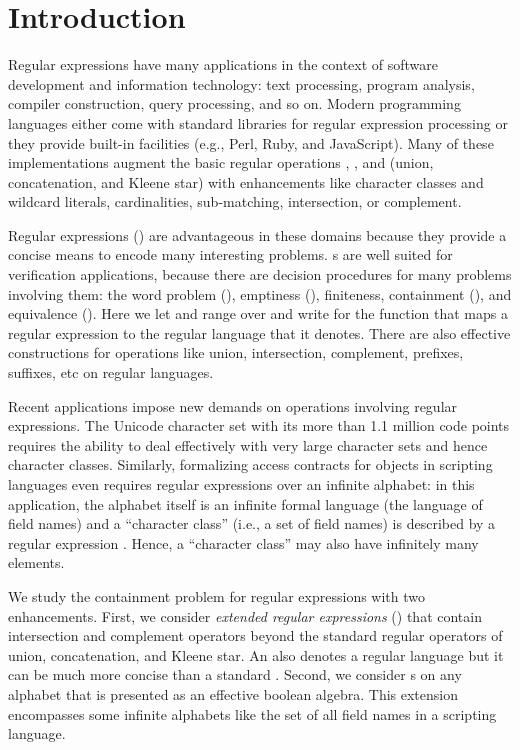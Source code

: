 \section{Introduction}
\label{sec:Introduction}

Regular expressions have many applications in the context of software
development and information technology: text processing, program analysis, compiler
construction, query processing, and so on. Modern programming languages
either come with standard libraries for regular expression processing or they
provide built-in facilities (e.g., Perl, Ruby, and JavaScript). Many
of these implementations augment the basic regular operations ,
, and  (union, concatenation, and
Kleene star) with enhancements like character classes and wildcard
literals, cardinalities, sub-matching, intersection, or
complement.

Regular expressions (\RE) are advantageous in these domains because they provide a concise means to
encode many interesting problems. \RE{}s are well suited for verification applications, because
there are decision procedures for many problems involving them: the word problem
(), emptiness (), finiteness, containment
(), and equivalence (). Here
we let  and  range over \RE{} and write  for the function that maps
a regular expression to the regular language that it denotes. There are also effective constructions
for operations like union, intersection, complement, prefixes, suffixes, etc on regular languages.

Recent applications impose new demands on operations involving
regular expressions. The Unicode character set with its more than
1.1 million code points requires the ability to deal effectively with very large
character sets and hence character classes. Similarly, formalizing
access contracts for objects in scripting languages even requires
regular expressions over an infinite alphabet: in this application,
the alphabet itself is an infinite formal language (the language of field
names) and a ``character class'' (i.e., a set of field names) is described
by a regular expression \cite{KeilThiemann2013-Proxy,HeideggerBieniusaThiemann2012-popl}. Hence, a
``character class'' may also have infinitely many elements.

We study the containment problem for regular expressions with two enhancements.
First, we consider \emph{extended regular expressions} (\ERE) that
contain intersection and complement operators beyond the standard regular operators of union, concatenation,
and Kleene star. An \ERE{} also denotes a regular language but it can be much
more concise than a standard \RE.
Second, we consider \ERE{}s on any alphabet that is presented as an effective boolean algebra. This
extension encompasses some infinite alphabets like the set of all field names in a scripting
language. 

